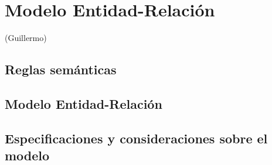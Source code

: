 \section{Modelo Entidad-Relación} (Guillermo)
\subsection{Reglas semánticas}
\subsection{Modelo Entidad-Relación}
\subsection{Especificaciones y consideraciones sobre el modelo}